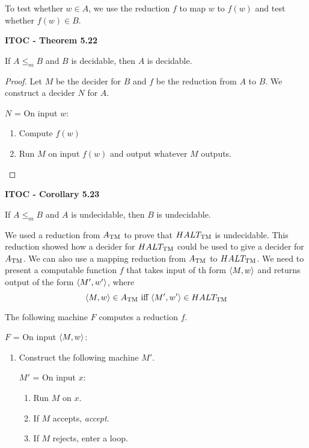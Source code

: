 To test whether $w\in A$, we use the reduction $f$ to map $w$ to $f(w)$ and test whether $f(w) \in B$.

\begin{shaded}
\textbf{ITOC - Theorem 5.22}

\medskip
If $A\leq_m B$ and $B$ is decidable, then $A$ is decidable.
\end{shaded}

\begin{mdframed}
\begin{proof}
Let $M$ be the decider for $B$ and $f$ be the reduction from $A$ to $B$. We construct a decider $N$ for $A$.

\medskip
$N$ = On input $w$:
\begin{enumerate}
\item Compute $f(w)$
\item Run $M$ on input $f(w)$ and output whatever $M$ outputs.
\end{enumerate}
\end{proof}
\end{mdframed}

\begin{shaded}
\textbf{ITOC - Corollary 5.23}

\medskip
If $A \leq_m B$ and $A$ is undecidable, then $B$ is undecidable.
\end{shaded}

We used a reduction from $A_{\text{TM}}$ to prove that $HALT_{\text{TM}}$ is undecidable. This reduction showed how a decider for $HALT_{\text{TM}}$ could be used to give a decider for $A_{\text{TM}}$. We can also use a mapping reduction from $A_{\text{TM}}$ to $HALT_{\text{TM}}$. We need to present a computable function $f$ that takes input of th form $\langle{M, w}\rangle$ and returns output of the form $\langle{M', w'}\rangle$, where
\[
\langle{M, w}\rangle \in A_{\text{TM}} \text{ iff }  \langle{M', w'}\rangle \in HALT_{\text{TM}}
\]

The following machine $F$ computes a reduction $f$.

\medskip
$F$ = On input $\langle{M, w}\rangle$:
\begin{enumerate}
\item Construct the following machine $M'$.

$M'$ = On input $x$:
\begin{enumerate}
\item Run $M$ on $x$.
\item If $M$ accepts, \textit{accept}.
\item If $M$ rejects, enter a loop.
\end{enumerate}
\end{enumerate}

